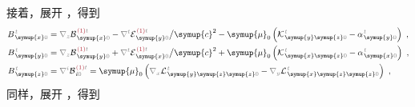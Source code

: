 接着，展开 ，得到
\begin{subequations} \label{eq:B_0}
\begin{align}
	B^{\;\!\mathcolor{gray}{t}}_{\;\! \symup{x}\mathcolor{gray}{0}} &= \mathcolor{gray}{\nabla_z} 
	{\mathcal{B}}^{\;\!\textcolor{Maroon}{(1)}\mathcolor{gray}{t}}_{\;\! \symup{x} \mathcolor{gray}{0}} - \mathcolor{gray}{\nabla^t} 
	{\mathcal{E}}^{\;\!\textcolor{Maroon}{(1)}\mathcolor{gray}{t}}_{\;\! \symup{y} \mathcolor{gray}{0}} \big/ {\symup{c}}^2 - {\symup{\mu}}_0 \left( 
	{\mathcal{K}}^{\;\!\mathcolor{gray}{t}}_{\;\! \symup{y}\symup{z}\mathcolor{gray}{0}} - 
	{\alpha}^{\;\!\mathcolor{gray}{t}}_{\;\! \symup{y}\mathcolor{gray}{0}} \right)~, \label{eq:B_x0} \\
	B^{\;\!\mathcolor{gray}{t}}_{\;\! \symup{y}\mathcolor{gray}{0}} &= \mathcolor{gray}{\nabla_z} 
	{\mathcal{B}}^{\;\!\textcolor{Maroon}{(1)}\mathcolor{gray}{t}}_{\;\! \symup{y} \mathcolor{gray}{0}} + \mathcolor{gray}{\nabla^t} 
	{\mathcal{E}}^{\;\!\textcolor{Maroon}{(1)}\mathcolor{gray}{t}}_{\;\! \symup{x} \mathcolor{gray}{0}} \big/ {\symup{c}}^2 + {\symup{\mu}}_0 \left( 
	{\mathcal{K}}^{\;\!\mathcolor{gray}{t}}_{\;\! \symup{x}\symup{z}\mathcolor{gray}{0}} - 
	{\alpha}^{\;\!\mathcolor{gray}{t}}_{\;\! \symup{x}\mathcolor{gray}{0}} \right)~, \label{eq:B_y0} \\
	B^{\;\!\mathcolor{gray}{t}}_{\;\! \symup{z} \mathcolor{gray}{0}} &= \mathcolor{gray}{\nabla^i} 
	{\mathcal{B}}^{\;\!\textcolor{Maroon}{(1)}\mathcolor{gray}{t}}_{\;\! i\mathcolor{gray}{0}} = {\symup{\mu}}_0 \left( \mathcolor{gray}{\nabla_x} {\mathcal{L}}^{\;\!\mathcolor{gray}{t}}_{\;\! \symup{y}\symup{z}\symup{z}\mathcolor{gray}{0}} - \mathcolor{gray}{\nabla_y}
	{\mathcal{L}}^{\;\!\mathcolor{gray}{t}}_{\;\! \symup{x}\symup{z}\symup{z}\mathcolor{gray}{0}} \right)~, \label{eq:B_z0}
\end{align}
\end{subequations}
同样，展开 ，得到

